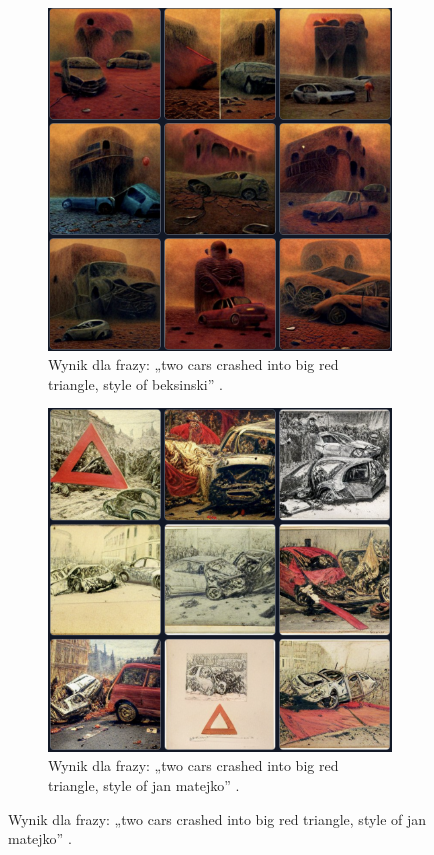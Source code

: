 \documentclass[12pt]{article}
\begin{document}
\begin{figure}[H]
\begin{subfigure}[H]{0.40\textwidth}
        \includegraphics[width=\textwidth]{u3.png}
        \caption{Wynik dla frazy: „two cars crashed into big red triangle, style of beksinski” \cite{6}.}
        \label{u3}
     \end{subfigure}
     \hfill
     \begin{subfigure}[H]{0.40\textwidth}
         \centering
         \includegraphics[width=\textwidth]{u4.png}
    \caption{Wynik dla frazy: „two cars crashed into big red triangle, style of jan matejko” \cite{6}.}
    \label{u4}
    \end{subfigure}
\end{figure}
\end{document}
